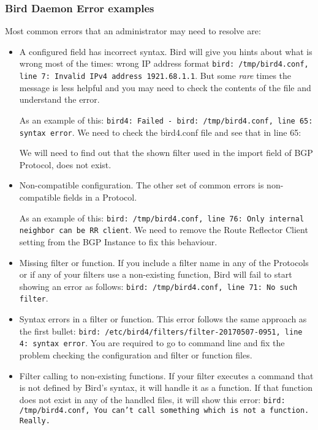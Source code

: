 \subsubsection{Bird Daemon Error examples}
Most common errors that an administrator may need to resolve are:

\begin{itemize}
\item A configured field has incorrect syntax.
Bird will give you hints about what is wrong most of the times: wrong IP address format \texttt{bird: /tmp/bird4.conf, line 7: Invalid IPv4 address 1921.68.1.1}. But some \textit{rare} times the message is less helpful and you may need to check the contents of the file and understand the error.

As an example of this: \texttt{bird4: Failed - bird: /tmp/bird4.conf, line 65: syntax error}. We need to check the bird4.conf file and see that in line 65:



We will need to find out that the shown filter used in the import field of BGP Protocol, does not exist.

\item Non-compatible configuration.
The other set of common errors is non-compatible fields in a Protocol.

As an example of this: \texttt{bird: /tmp/bird4.conf, line 76: Only internal neighbor can be RR client}. We need to remove the Route Reflector Client setting from the BGP Instance to fix this behaviour.

\item Missing filter or function.
If you include a filter name in any of the Protocols or if any of your filters use a non-existing function, Bird will fail to start showing an error as follows: \texttt{bird: /tmp/bird4.conf, line 71: No such filter}.

\item Syntax errors in a filter or function.
This error follows the same approach as the first bullet: \texttt{bird: /etc/bird4/filters/filter-20170507-0951, line 4: syntax error}. You are required to go to command line and fix the problem checking the configuration and filter or function files.

\item Filter calling to non-existing functions.
If your filter executes a command that is not defined by Bird's syntax, it will handle it as a function. If that function does not exist in any of the handled files, it will show this error: \texttt{bird: /tmp/bird4.conf, You can't call something which is not a function. Really.}


\end{itemize}
